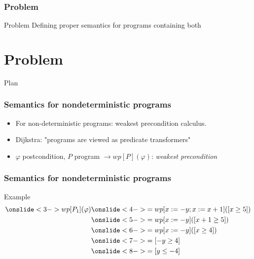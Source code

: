 \documentclass{beamer}
\begin{document}
\begin{frame}
\frametitle{Problem}

\begin{block}{Problem}
 Defining proper semantics for programs containing both\newline
{}
\end{block}

\end{frame}

\section{Problem}
\begin{frame}{Plan}
  \tableofcontents[sectionstyle=show/shaded]%
\end{frame}

\begin{frame}
\frametitle{Semantics for nondeterministic programs}
\begin{itemize}
\item<1-> For non-deterministic programs: weakest precondition calculus.
\item<2-> Dijkstra: "programs are viewed as predicate transformers"
\item<3-> $\varphi$ postcondition, $P$ program\newline
{} {$\rightarrow wp[P](\varphi)$: \emph{weakest precondition}}
\end{itemize}
\end{frame}

\begin{frame}
\frametitle{Semantics for nondeterministic programs}
\begin{block}{Example}
\begin{align*}
\onslide<3->{wp[P_1](\varphi)} &\onslide<4->{= wp[x := -y ; x := x+1]([x \geq 5])} \\
&\onslide<5->{= wp[x := -y]([x + 1 \geq 5])} \\
&\onslide<6->{= wp[x := -y]([x \geq 4]) }\\
&\onslide<7->{= [-y  \geq 4]}\\
&\onslide<8->{= [y \leq -4]}
\end{align*}
\end{block}
\end{frame}
\end{document}
